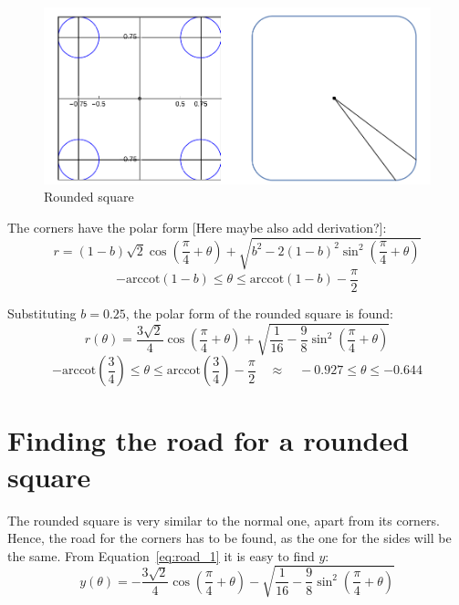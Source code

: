 \documentclass[12pt]{article}
\begin{document}
        \begin{figure}[H]
            \centering
            \includegraphics[width=0.9\linewidth]{images/rounded_square.png}
            \caption{Rounded square\cite{bridge_wolfram}}\label{fig:rounded_square}
        \end{figure}

        The corners have the polar form\cite{bridge_wolfram} [Here maybe also add derivation?]:
        \begin{equation}
            r = (1-b)\sqrt{2} \cos (\frac{\pi}{4} + \theta) + \sqrt{b^2 - 2(1-b)^2 \sin^2 (\frac{\pi}{4}+\theta)}
        \end{equation}
        \[- \text{arccot}(1-b) \leq \theta \leq \text{arccot}(1-b) - \frac{\pi}{2}\]

        Substituting $b=0.25$, the polar form of the rounded square is found:
        \begin{equation}
            r(\theta) = \frac{3\sqrt{2}}{4} \cos (\frac{\pi}{4} + \theta) + \sqrt{\frac{1}{16} - \frac{9}{8} \sin^2 (\frac{\pi}{4}+\theta)}
        \end{equation}
        \[- \text{arccot}(\frac{3}{4}) \leq \theta \leq \text{arccot}(\frac{3}{4}) - \frac{\pi}{2} \quad \approx \quad -0.927 \leq \theta \leq -0.644\]

    \section{Finding the road for a rounded square}

        The rounded square is very similar to the normal one, apart from its corners. Hence, the road for the corners has to be found, as the one for the sides will be the same. From Equation~\ref{eq:road_1} it is easy to find $y$:
        \begin{equation}\label{eq:rounded_ytheta}
            y(\theta) = - \frac{3\sqrt{2}}{4} \cos (\frac{\pi}{4} + \theta) - \sqrt{\frac{1}{16} - \frac{9}{8} \sin^2 (\frac{\pi}{4}+\theta)}
        \end{equation}
\end{document}
